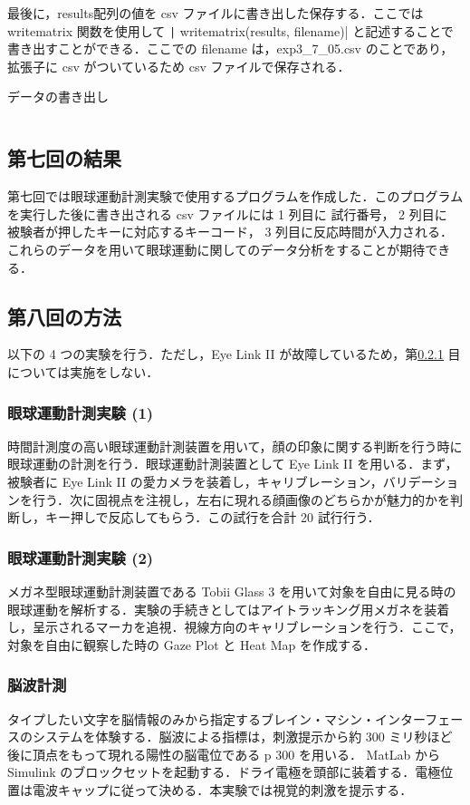 \documentclass[dvipdfmx, titlepage, t]{jsarticle}
\begin{document}
    最後に，results配列の値を csv ファイルに書き出した保存する．ここでは writematrix 関数を使用して \texttt| writematrix(results, filename)| と記述することで書き出すことができる．ここでの filename は，exp3\_7\_05.csv のことであり，拡張子に csv がついているため csv ファイルで保存される．
        \begin{program}
        \caption{データの書き出し}
        \inputminted[linenos,
        firstline=129,
        lastline=132,
        frame=lines,
        fontsize = \small]{matlab}{code/Exp3_7_Matlab.m}
        \label{lst:exp3_7_write}
    \end{program}


    \subsection{第七回の結果}
    第七回では眼球運動計測実験で使用するプログラムを作成した．このプログラムを実行した後に書き出される csv ファイルには 1 列目に 試行番号， 2 列目に 被験者が押したキーに対応するキーコード， 3 列目に反応時間が入力される．これらのデータを用いて眼球運動に関してのデータ分析をすることが期待できる．

    \subsection{第八回の方法}
    以下の 4 つの実験を行う．ただし，Eye Link II が故障しているため，第\ref{眼球} 目については実施をしない．
    \subsubsection{眼球運動計測実験 (1)}\label{眼球}
    時間計測度の高い眼球運動計測装置を用いて，顔の印象に関する判断を行う時に眼球運動の計測を行う．眼球運動計測装置として Eye Link II を用いる．まず，被験者に Eye Link II の愛カメラを装着し，キャリブレーション，バリデーションを行う．次に固視点を注視し，左右に現れる顔画像のどちらかが魅力的かを判断し，キー押しで反応してもらう．この試行を合計 20 試行行う．
    \subsubsection{眼球運動計測実験 (2)}
    メガネ型眼球運動計測装置である Tobii Glass 3 を用いて対象を自由に見る時の眼球運動を解析する．実験の手続きとしてはアイトラッキング用メガネを装着し，呈示されるマーカを追視．視線方向のキャリブレーションを行う．ここで，対象を自由に観察した時の Gaze Plot と Heat Map を作成する．
    \subsubsection{脳波計測}
    タイプしたい文字を脳情報のみから指定するブレイン・マシン・インターフェースのシステムを体験する．脳波による指標は，刺激提示から約 300 ミリ秒ほど後に頂点をもって現れる陽性の脳電位である p 300 を用いる． MatLab から Simulink のブロックセットを起動する．ドライ電極を頭部に装着する．電極位置は電波キャップに従って決める．本実験では視覚的刺激を提示する．
\end{document}
